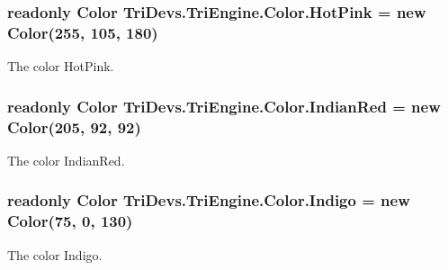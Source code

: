 \hypertarget{struct_tri_devs_1_1_tri_engine_1_1_color_a5cf2ee1676813fc9671b5cdaad7334b4}{
\subsubsection[{Hot\-Pink}]{\setlength{\rightskip}{0pt plus 5cm}readonly {\bf Color} Tri\-Devs.\-Tri\-Engine.\-Color.\-Hot\-Pink = new {\bf Color}(255, 105, 180)\hspace{0.3cm}{\ttfamily [static]}}}\label{struct_tri_devs_1_1_tri_engine_1_1_color_a5cf2ee1676813fc9671b5cdaad7334b4}


The color Hot\-Pink. 

\hypertarget{struct_tri_devs_1_1_tri_engine_1_1_color_a2586296ff22894fb6a951971d39b3a32}{
\subsubsection[{Indian\-Red}]{\setlength{\rightskip}{0pt plus 5cm}readonly {\bf Color} Tri\-Devs.\-Tri\-Engine.\-Color.\-Indian\-Red = new {\bf Color}(205, 92, 92)\hspace{0.3cm}{\ttfamily [static]}}}\label{struct_tri_devs_1_1_tri_engine_1_1_color_a2586296ff22894fb6a951971d39b3a32}


The color Indian\-Red. 

\hypertarget{struct_tri_devs_1_1_tri_engine_1_1_color_aeac25872ec8d6d49c01f12d48cb8f3e1}{
\subsubsection[{Indigo}]{\setlength{\rightskip}{0pt plus 5cm}readonly {\bf Color} Tri\-Devs.\-Tri\-Engine.\-Color.\-Indigo = new {\bf Color}(75, 0, 130)\hspace{0.3cm}{\ttfamily [static]}}}\label{struct_tri_devs_1_1_tri_engine_1_1_color_aeac25872ec8d6d49c01f12d48cb8f3e1}


The color Indigo. 

